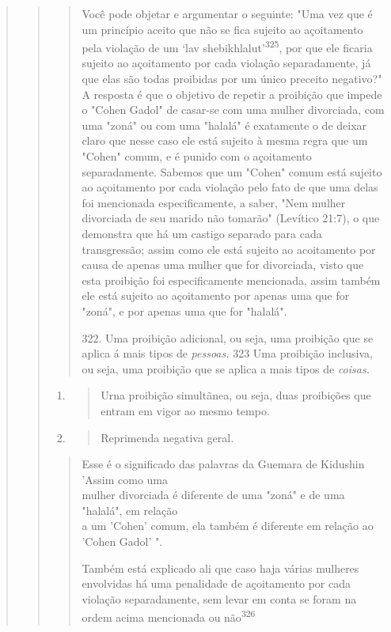 \begin{quote}
\begin{quote}
\begin{quote}
Você pode objetar e argumentar o seguinte: "Uma vez que é um prin­cípio
aceito que não se fica sujeito ao açoitamento pela violação de um `lav
she­bikhlalut'\textsuperscript{325}, por que ele ficaria sujeito ao
açoitamento por cada violação sepa­radamente, já que elas são todas
proibidas por um único preceito negativo?" A resposta é que o objetivo
de repetir a proibição que impede o "Cohen Gadol" de casar-se com uma
mulher divorciada, com uma "zoná" ou com uma "halalá" é exatamente o de
deixar claro que nesse caso ele está sujeito à mesma regra que um
"Cohen" comum, e é punido com o açoitamento separadamente. Sabe­mos que
um "Cohen" comum está sujeito ao açoitamento por cada violação pe­lo
fato de que uma delas foi mencionada especificamente, a saber, "Nem
mulher divorciada de seu marido não tomarão" (Levítico 21:7), o que
demonstra que há um castigo separado para cada transgressão; assim como
ele está sujeito ao acoitamento por causa de apenas uma mulher que for
divorciada, visto que esta proibição foi especificamente mencionada,
assim também ele está sujeito ao açoi­tamento por apenas uma que for
"zoná", e por apenas uma que for "halalá".

322. Uma proibição adicional, ou seja, uma proibição que se aplica á
mais tipos de \emph{pessoas.} 323 Uma proibição inclusiva, ou seja, uma
proibição que se aplica a mais tipos de \emph{coisas.}
\end{quote}

\begin{enumerate}
\def\labelenumi{\arabic{enumi}.}
\setcounter{enumi}{323}
\item
 \begin{quote}
 Urna proibição simultãnea, ou seja, duas proibições que entram em
 vigor ao mesmo tempo.
 \end{quote}
\item
 \begin{quote}
 Reprimenda negativa geral.
 \end{quote}
\end{enumerate}

\begin{quote}

Esse é o significado das palavras da Guemara de Kidushin 'Assim como
uma\\
mulher divorciada é diferente de uma "zoná" e de uma "halalá", em
relação\\
a um 'Cohen' comum, ela também é diferente em relação ao 'Cohen Gadol'
".

Também está explicado ali que caso haja várias mulheres envolvidas há
uma penalidade de açoitamento por cada violação separadamente, sem
le­var em conta se foram na ordem acima mencionada ou
não\textsuperscript{326}


\end{quote}
\end{quote}
\end{quote}
